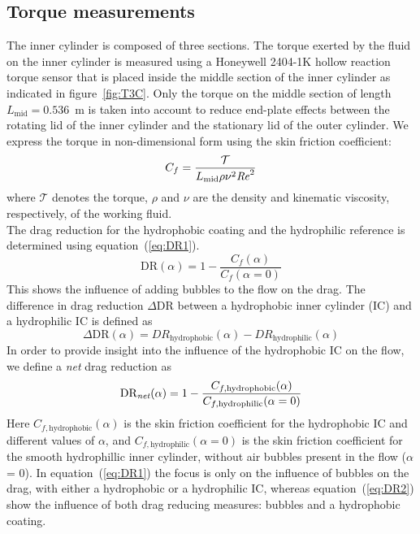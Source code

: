 \subsection{Torque measurements}
The inner cylinder is composed of three sections. The torque exerted by the fluid on the inner cylinder is measured using a Honeywell 2404-1K hollow reaction torque sensor that is placed inside the middle section of the inner cylinder as indicated in figure~\ref{fig:T3C}. Only the torque on the middle section of length $L_{\text{mid}} = 0.536$~m is taken into account to reduce end-plate effects between the rotating lid of the inner cylinder and the stationary lid of the outer cylinder. We express the torque in non-dimensional form using the skin friction coefficient:
\begin{equation}\label{eq:cf}
C_f = \frac{\mathcal{T}}{L_{\text{mid}}\rho\nu^2\mbox{\textit{Re}}^2}
\end{equation}
where $\mathcal{T}$ denotes the torque, $\rho$ and $\nu$ are the density and kinematic viscosity, respectively, of the working fluid. \\
The drag reduction for the {hydrophobic} coating and the hydrophilic reference is determined using equation~(\ref{eq:DR1}).
\begin{equation}\label{eq:DR1}
\text{DR}(\alpha) = 1 - \frac{C_{f}(\alpha)} {C_{f}(\alpha=0)}
\end{equation}
This shows the influence of adding bubbles to the flow on the drag. The difference in drag reduction $\Delta\text{DR}$ between a {hydrophobic} inner cylinder (IC) and a hydrophilic IC is defined as
\begin{equation}\label{eq:deltaDR}
\Delta\text{DR}(\alpha) = DR_\text{hydrophobic}(\alpha) - DR_\text{hydrophilic}(\alpha)
\end{equation}
In order to provide insight into the influence of the {hydrophobic} IC on the flow, we define a {\it net} drag reduction as
\begin{equation}\label{eq:DR2}
\text{DR}_\text{\it net}(\alpha) = 1 - \frac{C_{f,\text{hydrophobic}}(\alpha)}{C_{f,\text{hydrophilic}}(\alpha = 0)}
\end{equation}
Here $C_{f,\text{hydrophobic}}(\alpha)$ is the skin friction coefficient for the {hydrophobic} IC and different values of $\alpha$, and $C_{f,\text{hydrophilic}}(\alpha = 0)$ is the skin friction coefficient for the smooth hydrophillic inner cylinder, without air bubbles present in the flow ($\alpha$ = 0). In equation~(\ref{eq:DR1}) the focus is only on the influence of bubbles on the drag, with either a {hydrophobic} or a hydrophilic IC, whereas equation~(\ref{eq:DR2}) show the influence of both drag reducing measures: bubbles and a {hydrophobic} coating.

